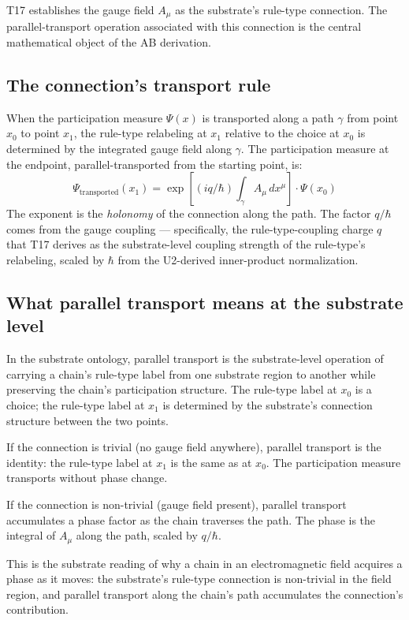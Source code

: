 \documentclass[11pt,a4paper]{article}
\begin{document}
T17 establishes the gauge field $A_\mu$ as the substrate's rule-type connection. The parallel-transport operation associated with this connection is the central mathematical object of the AB derivation.

\subsection{The connection's transport rule}

When the participation measure $\Psi(x)$ is transported along a path $\gamma$ from point $x_0$ to point $x_1$, the rule-type relabeling at $x_1$ relative to the choice at $x_0$ is determined by the integrated gauge field along $\gamma$. The participation measure at the endpoint, parallel-transported from the starting point, is:
\[
\Psi_{\mathrm{transported}}(x_1) = \exp\!\left[(iq/\hbar) \int_\gamma A_\mu \, dx^\mu\right] \cdot \Psi (x_0)
\]
The exponent is the \emph{holonomy} of the connection along the path. The factor $q/\hbar$ comes from the gauge coupling --- specifically, the rule-type-coupling charge $q$ that T17 derives as the substrate-level coupling strength of the rule-type's relabeling, scaled by $\hbar$ from the U2-derived inner-product normalization.

\subsection{What parallel transport means at the substrate level}

In the substrate ontology, parallel transport is the substrate-level operation of carrying a chain's rule-type label from one substrate region to another while preserving the chain's participation structure. The rule-type label at $x_0$ is a choice; the rule-type label at $x_1$ is determined by the substrate's connection structure between the two points.

If the connection is trivial (no gauge field anywhere), parallel transport is the identity: the rule-type label at $x_1$ is the same as at $x_0$. The participation measure transports without phase change.

If the connection is non-trivial (gauge field present), parallel transport accumulates a phase factor as the chain traverses the path. The phase is the integral of $A_\mu$ along the path, scaled by $q/\hbar$.

This is the substrate reading of why a chain in an electromagnetic field acquires a phase as it moves: the substrate's rule-type connection is non-trivial in the field region, and parallel transport along the chain's path accumulates the connection's contribution.
\end{document}
